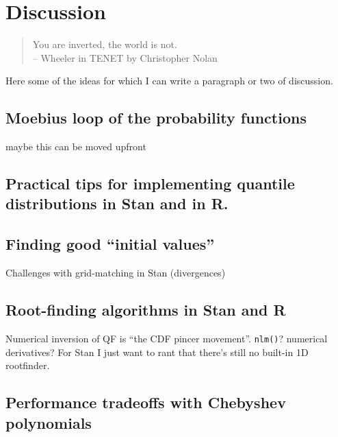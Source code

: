 \documentclass[
  12pt,
]{article}
\begin{document}
\hypertarget{discussion}{%
\section{Discussion}\label{discussion}}

\begin{quotation} 
You are inverted, the world is not. \\ 
-- Wheeler in TENET by Christopher Nolan
\end{quotation}

Here some of the ideas for which I can write a paragraph or two of discussion.

\hypertarget{moebius-loop-of-the-probability-functions}{%
\subsection{Moebius loop of the probability functions}\label{moebius-loop-of-the-probability-functions}}

maybe this can be moved upfront

\hypertarget{practical-tips-for-implementing-quantile-distributions-in-stan-and-in-r.}{%
\subsection{Practical tips for implementing quantile distributions in Stan and in R.}\label{practical-tips-for-implementing-quantile-distributions-in-stan-and-in-r.}}

\hypertarget{finding-good-initial-values}{%
\subsection{Finding good ``initial values''}\label{finding-good-initial-values}}

Challenges with grid-matching in Stan (divergences)

\hypertarget{root-finding-algorithms-in-stan-and-r}{%
\subsection{Root-finding algorithms in Stan and R}\label{root-finding-algorithms-in-stan-and-r}}

Numerical inversion of QF is ``the CDF pincer movement''.
\texttt{nlm()}? numerical derivatives? For Stan I just want to rant that there's still no built-in 1D rootfinder.

\hypertarget{performance-tradeoffs-with-chebyshev-polynomials}{%
\subsection{Performance tradeoffs with Chebyshev polynomials}\label{performance-tradeoffs-with-chebyshev-polynomials}}
\end{document}
